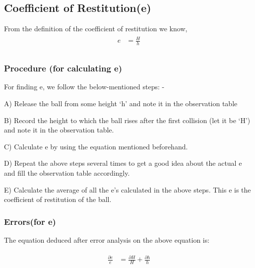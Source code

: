 \documentclass[11pt]{scrartcl} %
\begin{document}
\subsection{Coefficient of Restitution(e)}
From the definition of the coefficient of restitution we know, 
\begin{align} 
	\begin{split}
		e &= \frac{H}{h}\\
	\end{split}					
\end{align}

\subsubsection{Procedure (for calculating e)}
For finding e, we follow the below-mentioned steps: - \par

A) Release the ball from some height ‘h’ and note it in the observation table \par

B) Record the height to which the ball rises after the first collision (let it be ‘H’) and note it in the observation table. \par

C) Calculate e by using the equation mentioned beforehand. \par

D) Repeat the above steps several times to get a good idea about the actual e and fill the observation table accordingly. \par

E) Calculate the average of all the e’s calculated in the above steps. This e is the coefficient of restitution of the ball. \par

\subsubsection{Errors(for e)}
The equation deduced after error analysis on the above equation is:\par

\begin{align} 
	\begin{split}
		\frac{\partial{e}}{e} &= \frac{\partial{H}}{H} + \frac{\partial{h}}{h}\\
	\end{split}					
\end{align}
\end{document}
